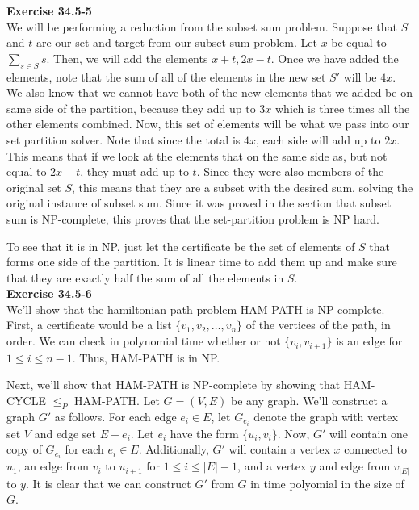 \documentclass{article}
\begin{document}
\noindent\textbf{Exercise 34.5-5}\\

We will be performing a reduction from the subset sum problem. Suppose that $S$ and $t$ are our set and target from our subset sum problem. Let $x$ be equal to $ \sum_{s\in S} s$. Then, we will add the elements $x+t, 2x-t$. Once we have added the elements, note that the sum of all of the elements in the new set $S'$ will be $4x$. We also know that we cannot have both of the new elements that we added be on same side of the partition, because they add up to $3x$ which is three times all the other elements combined. Now, this set of elements will be what we pass into our set partition solver. Note that since the total is $4x$, each side will add up to $2x$. This means that if we look at the elements that on the same side as, but not equal to $2x-t$, they must add up to $t$. Since they were also members of the original set $S$, this means that they are a subset with the desired sum, solving the original instance of subset sum. Since it was proved in the section that subset sum is NP-complete, this proves that the set-partition problem is NP hard. 

To see that it is in NP, just let the certificate be the set of elements of $S$ that forms one side of the partition. It is linear time to add them up and make sure that they are exactly half the sum of all the elements in $S$.\\

\noindent\textbf{Exercise 34.5-6}\\

We'll show that the hamiltonian-path problem HAM-PATH is NP-complete.  First, a certificate would be a list $\{v_1, v_2, \ldots, v_n\}$ of the vertices of the path, in order.  We can check in polynomial time whether or not $\{v_i, v_{i+1}\}$ is an edge for $1 \leq i \leq n-1$.  Thus, HAM-PATH is in NP.  

Next, we'll show that HAM-PATH is NP-complete by showing that HAM-CYCLE $\leq_P$ HAM-PATH.  Let $G = (V,E)$ be any graph.  We'll construct a graph $G'$ as follows.  For each edge $e_i \in E$, let $G_{e_i}$ denote the graph with vertex set $V$ and edge set $E - e_i$.  Let $e_i$ have the form $\{u_i,v_i\}$.  Now, $G'$ will contain one copy of $G_{e_i}$ for each $e_i \in E$.  Additionally, $G'$ will contain a vertex $x$ connected to $u_1$, an edge from $v_i$ to $u_{i+1}$ for $1 \leq i \leq |E|-1$, and a vertex $y$ and edge from $v_{|E|}$ to $y$.  It is clear that we can construct $G'$ from $G$ in time polyomial in the size of $G$.  
\end{document}
